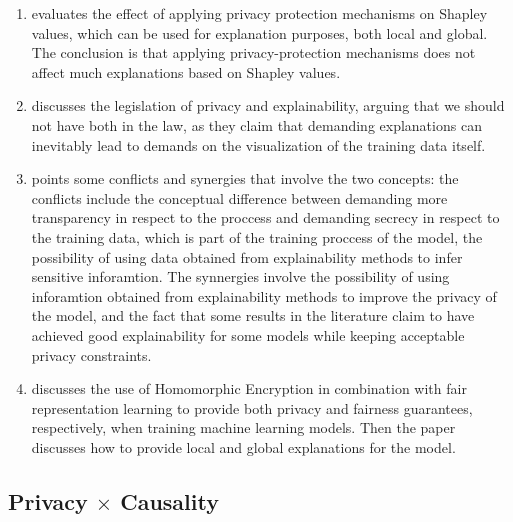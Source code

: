 \begin{enumerate}
\item \cite{Privacy and Explainability: The Effects of Data Protection on Shapley Values} evaluates the effect of applying privacy protection mechanisms on Shapley values, which can be used for explanation purposes, both local and global. The conclusion is that applying privacy-protection mechanisms does not affect much explanations based on Shapley values.
\item \cite{Show us the data: Privacy, explainability, and why the law can't have both} discusses the legislation of privacy and explainability, arguing that we should not have both in the law, as they claim that demanding explanations can inevitably lead to demands on the visualization of the training data itself.
\item \cite{SoK: Taming the Triangle--On the Interplays between Fairness, Interpretability and Privacy in Machine Learning} points some conflicts and synergies that involve the two concepts: the conflicts include the conceptual difference between demanding more transparency in respect to the proccess and demanding secrecy in respect to the training data, which is part of the training proccess of the model, the possibility of using data obtained from explainability methods to infer sensitive inforamtion. The synnergies involve the possibility of using inforamtion obtained from explainability methods to improve the privacy of the model, and the fact that some results in the literature claim to have achieved good explainability for some models while keeping acceptable privacy constraints.
\item \cite{Toward Learning Trustworthily from Data Combining Privacy, Fairness, and Explainability: An Application to Face Recognition} discusses the use of Homomorphic Encryption in combination with fair representation learning \cite{Learning fair representations} to provide both privacy and fairness guarantees, respectively, when training machine learning models. Then the paper discusses how to provide local and global explanations for the model.
\end{enumerate}


\subsection{Privacy $\times$ Causality}

